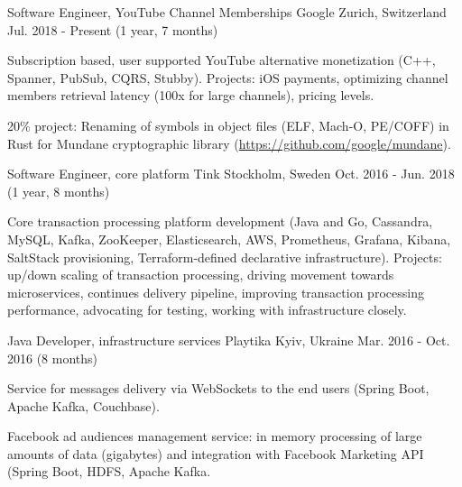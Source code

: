 

\begin{cventries}

  \cventry
    {Software Engineer, YouTube Channel Memberships} %
    {Google} %
    {Zurich, Switzerland} %
    {Jul. 2018 - Present (1 year, 7 months)} %
    {
      \begin{cvitems}
        \item {Subscription based, user supported YouTube alternative monetization (C++, Spanner, PubSub, CQRS, Stubby). Projects: iOS payments, optimizing channel members retrieval latency (100x for large channels), pricing levels.}
        \item {20\% project: Renaming of symbols in object files (ELF, Mach-O, PE/COFF) in Rust for Mundane cryptographic library (\url{https://github.com/google/mundane}).}
      \end{cvitems}
    }

  \cventry
    {Software Engineer, core platform} %
    {Tink} %
    {Stockholm, Sweden} %
    {Oct. 2016 - Jun. 2018 (1 year, 8 months)} %
    {
      \begin{cvitems} %
        \item {Core transaction processing platform development (Java and Go, Cassandra, MySQL, Kafka, ZooKeeper, Elasticsearch, AWS, Prometheus, Grafana, Kibana, SaltStack provisioning, Terraform-defined declarative infrastructure). Projects: up/down scaling of transaction processing, driving movement towards microservices, continues delivery pipeline, improving transaction processing performance, advocating for testing, working with infrastructure closely.}
      \end{cvitems}
    }

  \cventry
    {Java Developer, infrastructure services} %
    {Playtika} %
    {Kyiv, Ukraine} %
    {Mar. 2016 - Oct. 2016 (8 months)} %
    {
      \begin{cvitems} %
        \item {Service for messages delivery via WebSockets to the end users (Spring Boot, Apache Kafka, Couchbase).}
        \item {Facebook ad audiences management service: in memory processing of large amounts of data (gigabytes) and integration with Facebook Marketing API (Spring Boot, HDFS, Apache Kafka.}
      \end{cvitems}
    }


\end{cventries}
